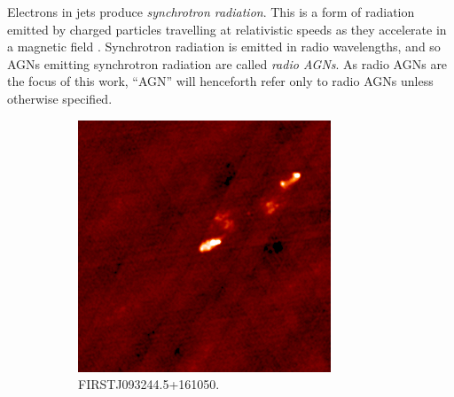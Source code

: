         Electrons in jets produce \emph{synchrotron radiation}. This is a
        form of radiation emitted by charged particles travelling at
        relativistic speeds as they accelerate in a magnetic field
        \citep{sokolov67}. Synchrotron radiation is emitted in radio
        wavelengths, and so AGNs emitting synchrotron radiation are called
        \emph{radio AGNs}. As radio AGNs are the focus of this work, ``AGN''
        will henceforth refer only to radio AGNs unless otherwise specified.

        \begin{figure}
            \centering
            \begin{subfigure}{0.4\textwidth}
                \includegraphics[width=\textwidth]
                    {images/FIRST_093244.58+161050.7.PNG}
                \caption{FIRSTJ093244.5+161050.}
                \label{fig:first-triple}
            \end{subfigure}%
            ~
            \begin{subfigure}{0.4\textwidth}

\end{subfigure}
\end{figure}
